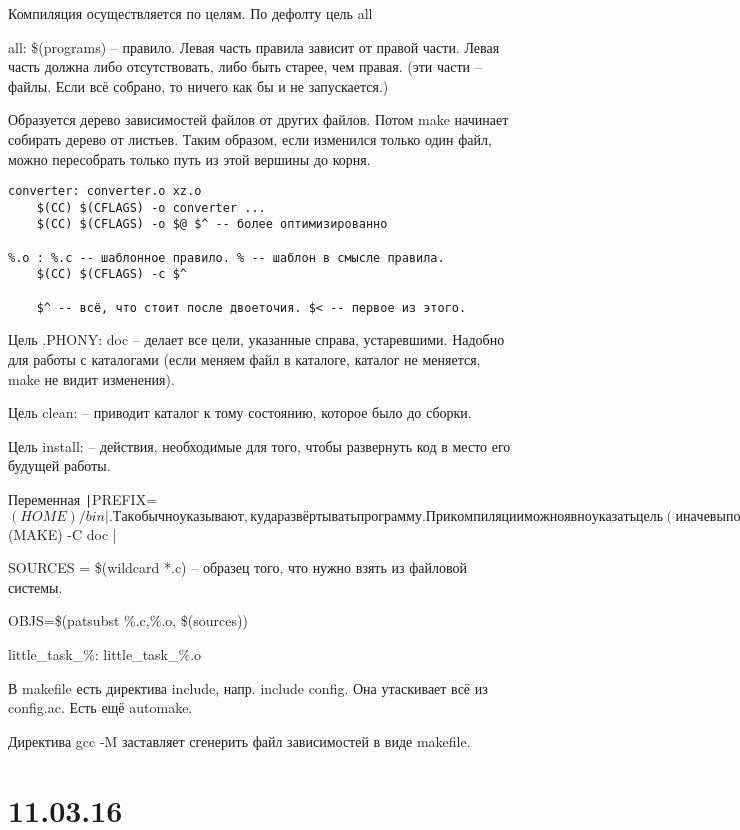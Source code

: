 \documentclass[a4paper,10pt]{article}
\newcommand{\bash}{\texttt}
\begin{document}
Компиляция осуществляется по целям. По дефолту цель all

all: \$(programs) -- правило. Левая часть правила зависит от правой части. Левая часть должна либо отсутствовать, либо быть старее, чем правая. 
(эти части -- файлы. Если всё собрано, то ничего как бы и не запускается.)

Образуется дерево зависимостей файлов от других файлов. Потом make начинает собирать дерево от листьев. Таким образом, если изменился только один файл, можно пересобрать только путь из этой вершины до корня.

\begin{verbatim}
converter: converter.o xz.o
	$(CC) $(CFLAGS) -o converter ... 
	$(CC) $(CFLAGS) -o $@ $^ -- более оптимизированно

%.o : %.c -- шаблонное правило. % -- шаблон в смысле правила.
	$(CC) $(CFLAGS) -c $^

	$^ -- всё, что стоит после двоеточия. $< -- первое из этого.
\end{verbatim}
Цель .PHONY: doc -- делает все цели, указанные справа, устаревшими. Надобно для работы с каталогами (если меняем файл в каталоге, каталог не меняется, make не видит изменения).

Цель clean: -- приводит каталог к тому состоянию, которое было до сборки.

Цель install: -- действия, необходимые для того, чтобы развернуть код в место его будущей работы.

Переменная \bash|PREFIX=$(HOME)/bin|. Так обычно указывают, куда развёртывать программу.

При компиляции можно явно указать цель (иначе выполняется первая цель в Makefile). Напр., make clean.

Если хочется вызвать make из подкаталога, то \bash|$(MAKE) -C doc |

SOURCES = \$(wildcard *.c) -- образец того, что нужно взять из файловой системы.

OBJS=\$(patsubst \%.c,\%.o, \$(sources))

little\_task\_\%: little\_task\_\%.o

В makefile есть директива include, напр. include config. Она утаскивает всё из config.ac. Есть ещё automake.

Директива gcc -M заставляет сгенерить файл зависимостей в виде makefile.

\section{11.03.16}
\end{document}
